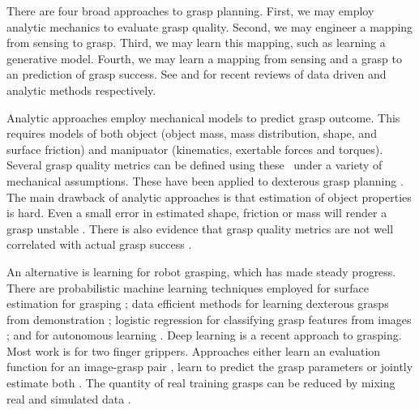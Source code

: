 There are four broad approaches to grasp planning. First, we may employ analytic mechanics to evaluate grasp quality. Second, we may engineer a mapping from sensing to grasp. Third, we may learn this mapping, such as learning a generative model. Fourth, we may learn a mapping from sensing and a grasp to an prediction of grasp success. See \cite{bohg2014data} and  \cite{sahbani2012overview} for recent reviews of data driven and analytic methods respectively.

Analytic approaches employ mechanical models to predict grasp outcome\cite{bicchi2000a,Liu2000,Pollard2004,miller2004}. This requires models of both object (object mass, mass distribution, shape, and surface friction) and manipuator (kinematics, exertable forces and torques). Several grasp quality metrics can be defined using these~\cite{Ferrari1992,Roa2015,Shimoga1996} under a variety of mechanical assumptions. These have been applied to dexterous grasp planning \cite{Boutselis2014,Gori2014,Hang2014,Rosales2012,Saut2012,ciocarlie2009hand}. The main drawback of analytic approaches is that estimation of object properties is hard. Even a small error in estimated shape, friction or mass will render a grasp unstable \cite{zheng2005a}. There is also evidence that grasp quality metrics are not well correlated with actual grasp success \cite{bekiroglu2011b,kim2013a,goins2014a}.

An alternative is learning for robot grasping, which has made steady progress. There are probabilistic machine learning techniques employed for surface estimation for grasping \cite{dragiev2011gaussian}; data efficient methods for learning dexterous grasps from demonstration \cite{ben-amor2012a,kopicki2015ijrr,detry2012a}; logistic regression for classifying grasp features from images \cite{saxena2008a}; and for autonomous learning \cite{detry2010a}. Deep learning is a recent approach to grasping. Most work is for two finger grippers. Approaches either learn an evaluation function for an image-grasp pair \cite{levine16,lenz2015deep,gualtieri2016high,mahler2017dex,pinto2016supersizing,johns2016deep}, learn to predict the grasp parameters \cite{redmon2015real,kumra2017iros} or jointly estimate both \cite{morrison18}. The quantity of real training grasps can be reduced by mixing real and simulated data \cite{bousmalis2017using}. 



